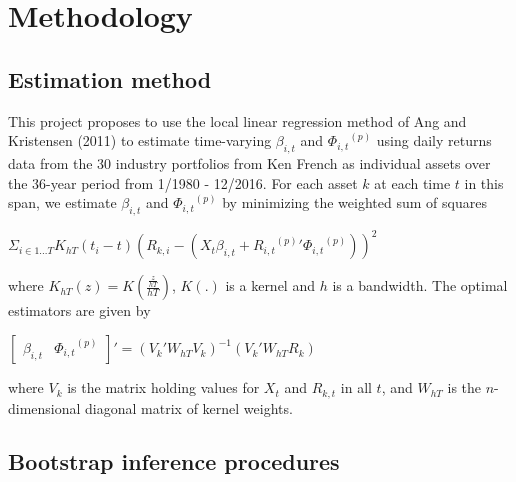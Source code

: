 \documentclass{article}
\begin{document}
\section{Methodology}

\subsection*{Estimation method}
This project proposes to use the local linear regression method of Ang and Kristensen (2011) to estimate time-varying \(\beta_{i,t}\) and  \({\Phi_{i,t}}^{(p)}\) using daily returns data from the 30 industry portfolios from Ken French as individual assets over the 36-year period from 1/1980 - 12/2016. For each asset \(k\) at each time \(t\) in this span, we estimate \(\beta_{i,t}\) and  \({\Phi_{i,t}}^{(p)}\)  by minimizing the weighted sum of squares 
\newline
\begin{center}\(\Sigma_{i \in 1...T} K_{hT}(t_{i} - t) (R_{k,i} - (X_{t}\beta_{i,t} + {{R_{i,t}}^{(p)}}' {\Phi_{i,t}}^{(p)}))^{2}\)\end{center}
where \(K_{hT}(z) = K(\frac{\frac{z}{hT}}{hT})\), \(K(.)\) is a kernel and \(h\) is a bandwidth. The optimal estimators are given by 
\newline
\begin{center}\({\begin{bmatrix}\beta_{i,t} &{\Phi_{i,t}}^{(p)}\end{bmatrix}}' = ({V_{k}}'W_{hT}V_{k})^{-1}(V_{k}'W_{hT}R_{k})\)\end{center}
where \(V_{k}\) is the matrix holding values for \(X_{t}\)  and \(R_{k,t}\) in all \(t\), and \(W_{hT}\) is the \(n\)-dimensional diagonal matrix of kernel weights.

\subsection*{Bootstrap inference procedures}
\end{document}
